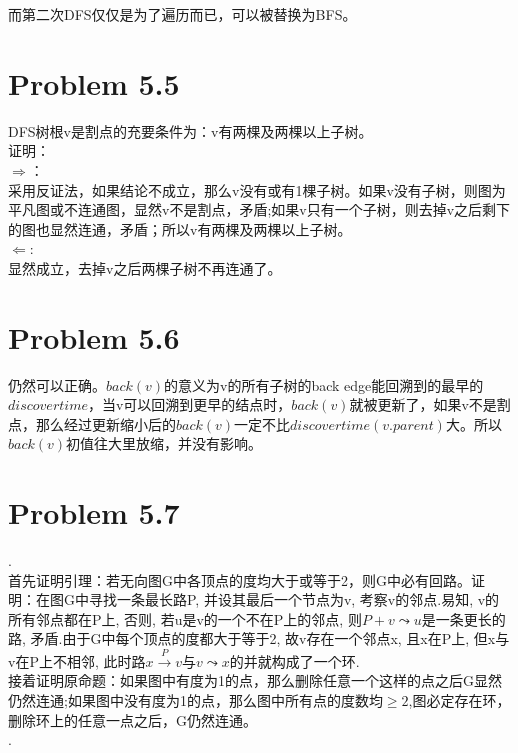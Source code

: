 \documentclass[twocolumn]{ctexart}
\begin{document}
\indent 而第二次DFS仅仅是为了遍历而已，可以被替换为BFS。

\section*{Problem 5.5}
\noindent DFS树根v是割点的充要条件为：v有两棵及两棵以上子树。\\
\noindent 证明：\\
\indent $\Longrightarrow$：\\
\indent 采用反证法，如果结论不成立，那么v没有或有1棵子树。如果v没有子树，则图为平凡图或不连通图，显然v不是割点，矛盾;如果v只有一个子树，则去掉v之后剩下的图也显然连通，矛盾；所以v有两棵及两棵以上子树。\\
\indent $\Longleftarrow$: \\
\indent 显然成立，去掉v之后两棵子树不再连通了。

\section*{Problem 5.6}
\indent 仍然可以正确。$back(v)$的意义为v的所有子树的back edge能回溯到的最早的$discovertime$，当v可以回溯到更早的结点时，$back(v)$就被更新了，如果v不是割点，那么经过更新缩小后的$back(v)$一定不比$discovertime(v.parent)$大。所以$back(v)$初值往大里放缩，并没有影响。\\


\section*{Problem 5.7}
.\\
\indent 首先证明引理：若无向图G中各顶点的度均大于或等于2，则G中必有回路。证明：在图G中寻找一条最长路P, 并设其最后一个节点为v, 考察v的邻点.易知, v的所有邻点都在P上, 否则, 若u是v的一个不在P上的邻点, 则$P+v\leadsto u$是一条更长的路, 矛盾.由于G中每个顶点的度都大于等于2, 故v存在一个邻点x, 且x在P上, 但x与v在P上不相邻, 此时路$x\xrightarrow{P}v$与$v\leadsto x$的并就构成了一个环.\\
\indent 接着证明原命题：如果图中有度为1的点，那么删除任意一个这样的点之后G显然仍然连通;如果图中没有度为1的点，那么图中所有点的度数均$\ge2$,图必定存在环，删除环上的任意一点之后，G仍然连通。\\
.\\
\begin{center}
\end{center}
\end{document}
